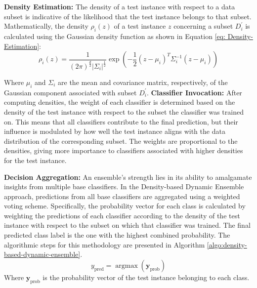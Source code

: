 \documentclass[lettersize,journal]{IEEEtran}
\begin{document}
	\textbf{Density Estimation:} The density of a test instance with respect to a data subset is indicative of the likelihood that the test instance belongs to that subset. Mathematically, the density $\rho_i(z)$ of a test instance $z$ concerning a subset $D_i^{\prime}$ is calculated using the Gaussian density function as shown in Equation \ref{eq: Density-Estimation}:
	\begin{equation}\label{eq: Density-Estimation}
		\rho_i(z)=\frac{1}{(2 \pi)^{\frac{d}{2}}\left|\Sigma_i\right|^{\frac{1}{2}}} \exp \left(-\frac{1}{2}\left(z-\mu_i\right)^T \Sigma_i^{-1}\left(z-\mu_i\right)\right)
	\end{equation}
	
	Where $\mu_i$ and $\Sigma_i$ are the mean and covariance matrix, respectively, of the Gaussian component associated with subset $D_i^{\prime}$.
	\textbf{Classifier Invocation:} After computing densities, the weight of each classifier is determined based on the density of the test instance with respect to the subset the classifier was trained on. This means that all classifiers contribute to the final prediction, but their influence is modulated by how well the test instance aligns with the data distribution of the corresponding subset. The weights are proportional to the densities, giving more importance to classifiers associated with higher densities for the test instance.
	
	\textbf{Decision Aggregation:} An ensemble's strength lies in its ability to amalgamate insights from multiple base classifiers. In the Density-based Dynamic Ensemble approach, predictions from all base classifiers are aggregated using a weighted voting scheme. Specifically, the probability vector for each class is calculated by weighting the predictions of each classifier according to the density of the test instance with respect to the subset on which that classifier was trained. The final predicted class label is the one with the highest combined probability. The algorithmic steps for this methodology are presented in Algorithm \ref{algo:density-based-dynamic-ensemble}.
	\begin{equation}
		y_{\text{pred}} = \operatorname{argmax}\left(\mathbf{y}_{\text{prob}}\right)
	\end{equation}
	Where $\mathbf{y}_{\text{prob}}$ is the probability vector of the test instance belonging to each class.
	
\end{document}
